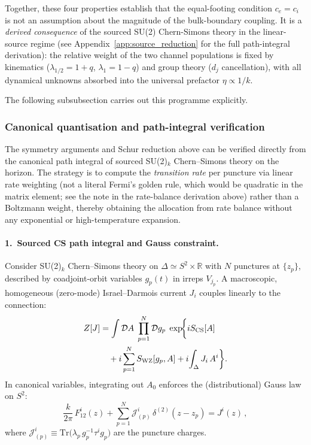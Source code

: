 \documentclass[aps,prd,twocolumn,10pt,superscriptaddress,nofootinbib]{revtex4-2}
\begin{document}
Together, these four properties establish that the equal-footing
condition $c_e = c_i$ is not an assumption about the magnitude
of the bulk-boundary coupling.  It is a \emph{derived consequence}
of the sourced SU(2) Chern-Simons theory in the linear-source
regime (see Appendix~\ref{app:source_reduction} for the full
path-integral derivation):
the relative weight of the two channel populations is fixed by
kinematics ($\lambda_{1/2} = 1+q$, $\lambda_1 = 1-q$) and
group theory ($d_j$ cancellation), with all dynamical unknowns
absorbed into the universal prefactor $\eta \propto 1/k$.

The following subsubsection carries out this programme explicitly.


\subsubsection{Canonical quantisation and path-integral
verification}
\label{sec:path_integral_proof}

The symmetry arguments and Schur reduction above can be verified
directly from the canonical path integral of sourced SU(2)$_k$
Chern--Simons theory on the horizon.  The strategy is to compute
the \emph{transition rate} per puncture via linear rate weighting
(not a literal Fermi's golden rule, which would be quadratic in
the matrix element; see the note in the rate-balance derivation
above) rather than a Boltzmann weight, thereby obtaining the
allocation from rate balance without any exponential or
high-temperature expansion.

\paragraph{1.\ Sourced CS path integral and Gauss constraint.}

Consider SU(2)$_k$ Chern--Simons theory on
$\Delta \simeq S^2 \times \mathbb{R}$ with $N$ punctures at
$\{z_p\}$, described by coadjoint-orbit variables $g_p(t)$ in
irreps $V_{j_p}$.  A macroscopic, homogeneous (zero-mode)
Israel--Darmois current $J_i$ couples linearly to the connection:
\begin{align}
Z[J] &= \int \mathcal{D}A\;\prod_{p=1}^{N}\mathcal{D}g_p\;
  \exp\!\biggl\{iS_{\rm CS}[A]
\nonumber \\
  &\quad + i\sum_{p=1}^{N} S_{\rm WZ}[g_p, A]
    + i\!\int_\Delta J_i\,A^i\biggr\}.
\label{eq:ZJ_def}
\end{align}
In canonical variables, integrating out $A_0$ enforces the
(distributional) Gauss law on $S^2$:
\begin{equation}
\frac{k}{2\pi}\,F_{12}^i(z)
  + \sum_{p=1}^{N} \mathcal{J}^i_{(p)}\,
    \delta^{(2)}(z - z_p)
  = J^i(z)\,,
\label{eq:Gauss_source}
\end{equation}
where
$\mathcal{J}^i_{(p)} \equiv
  \mathrm{Tr}\!\bigl(\lambda_p\,g_p^{-1}\tau^i g_p\bigr)$
are the puncture charges.
\end{document}
